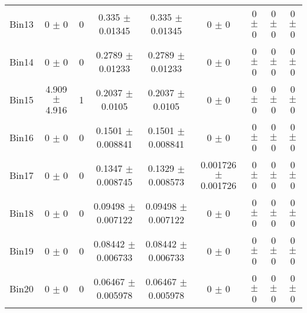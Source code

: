 \begin{tabular}{@{\extracolsep{4pt}}lcccccccc@{}}
     Bin13 & 0 $\pm$ 0 & 0 & 0.335 $\pm$ 0.01345 & 0.335 $\pm$ 0.01345 & 0 $\pm$ 0 & 0 $\pm$ 0 & 0 $\pm$ 0 & 0 $\pm$ 0 \\ 
     Bin14 & 0 $\pm$ 0 & 0 & 0.2789 $\pm$ 0.01233 & 0.2789 $\pm$ 0.01233 & 0 $\pm$ 0 & 0 $\pm$ 0 & 0 $\pm$ 0 & 0 $\pm$ 0 \\ 
     Bin15 & 4.909 $\pm$ 4.916 & 1 & 0.2037 $\pm$ 0.0105 & 0.2037 $\pm$ 0.0105 & 0 $\pm$ 0 & 0 $\pm$ 0 & 0 $\pm$ 0 & 0 $\pm$ 0 \\ 
     Bin16 & 0 $\pm$ 0 & 0 & 0.1501 $\pm$ 0.008841 & 0.1501 $\pm$ 0.008841 & 0 $\pm$ 0 & 0 $\pm$ 0 & 0 $\pm$ 0 & 0 $\pm$ 0 \\ 
     Bin17 & 0 $\pm$ 0 & 0 & 0.1347 $\pm$ 0.008745 & 0.1329 $\pm$ 0.008573 & 0.001726 $\pm$ 0.001726 & 0 $\pm$ 0 & 0 $\pm$ 0 & 0 $\pm$ 0 \\ 
     Bin18 & 0 $\pm$ 0 & 0 & 0.09498 $\pm$ 0.007122 & 0.09498 $\pm$ 0.007122 & 0 $\pm$ 0 & 0 $\pm$ 0 & 0 $\pm$ 0 & 0 $\pm$ 0 \\ 
     Bin19 & 0 $\pm$ 0 & 0 & 0.08442 $\pm$ 0.006733 & 0.08442 $\pm$ 0.006733 & 0 $\pm$ 0 & 0 $\pm$ 0 & 0 $\pm$ 0 & 0 $\pm$ 0 \\ 
     Bin20 & 0 $\pm$ 0 & 0 & 0.06467 $\pm$ 0.005978 & 0.06467 $\pm$ 0.005978 & 0 $\pm$ 0 & 0 $\pm$ 0 & 0 $\pm$ 0 & 0 $\pm$ 0 \\ 
\hline\hline
  \end{tabular}
